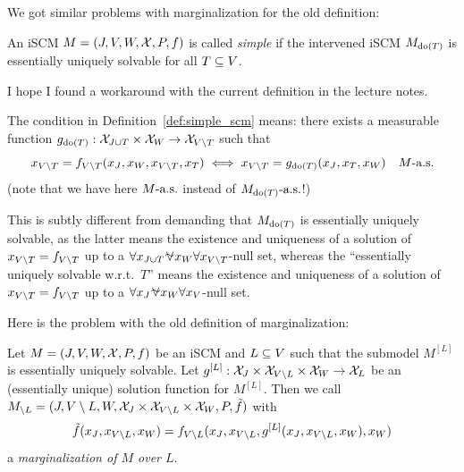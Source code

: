 We got similar problems with marginalization for the old definition:
\begin{Def}
  An iSCM $M = \left ( J, V, W, \mathcal{X}, P, f \right )$ is called \emph{simple} if the intervened iSCM $M_{\operatorname{do}(T)}$ is essentially uniquely solvable for all $T \subseteq V$. %
\end{Def}
I hope I found a workaround with the current definition in the lecture notes.
\begin{Rem}
  The condition in Definition~\ref{def:simple_scm} means:
    there exists a measurable function $g_{\operatorname{do}(T)} : \mathcal{X}_{J \cup T} \times \mathcal{X}_W \to \mathcal{X}_{V\setminus T}$ such that
    $$x_{V\setminus T} = f_{V\setminus T}(x_J,x_W,x_{V\setminus T},x_T) \iff x_{V\setminus T} = g_{\operatorname{do}(T)}(x_J, x_T, x_W)\quad M\text{-a.s.}$$
  (note that we have here $M\text{-a.s.}$ instead of $M_{\operatorname{do}(T)}\text{-a.s.}$!)

  This is subtly different from demanding that $M_{\operatorname{do}(T)}$ is essentially uniquely solvable,
  as the latter means the existence and uniqueness of a solution of $x_{V\setminus T} = f_{V\setminus T}$ up to a $\forall x_{J\cup T}\foralmostall x_W\forall x_{V\sm T}$-null set,
  whereas the ``essentially uniquely solvable w.r.t.\ $T$'' means the existence and uniqueness of a solution of $x_{V\setminus T} = f_{V\setminus T}$ up to a $\forall x_J\foralmostall x_W\forall x_V$-null set.
\end{Rem}
Here is the problem with the old definition of marginalization:
\begin{Def}
  Let $M = \left ( J, V, W, \mathcal{X}, P, f \right )$ be an iSCM and $L \subseteq V$ such that the submodel $M^{[L]}$ is essentially uniquely solvable.
  Let $g^{[L]} : \mathcal{X}_{J} \times \mathcal{X}_{V \setminus L} \times \mathcal{X}_{W} \to \mathcal{X}_L$ be an (essentially unique) solution function for $M^{[L]}$.
  Then we call $M_{\setminus L} = ( J, V \setminus L, W, \mathcal{X}_{J} \times \mathcal{X}_{V \setminus L} \times \mathcal{X}_{W}, P, \tilde{f} )$ with
  $$\tilde{f}(x_{J},x_{V \setminus L},x_{W}) = f_{V \setminus L}(x_{J},x_{V \setminus L},g^{[L]}(x_{J},x_{V \setminus L},x_{W}),x_{W})$$
  a \emph{marginalization of $M$ over $L$}.
\end{Def}
